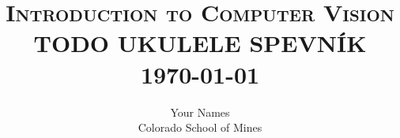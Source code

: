 \documentclass{article}
\begin{document}
%
	
\selectfont

\title{
	\normalsize \textsc{Introduction to Computer Vision} \\
	\vspace{20\baselineskip}
	\LARGE \textbf{\uppercase{TODO Ukulele Spevník}} \\
	\normalsize \today \vspace*{15\baselineskip}
}

\date{}

\author{
	Your Names \\ 
	Colorado School of Mines \\ }

\maketitle
\newpage

\tableofcontents
\end{document}
